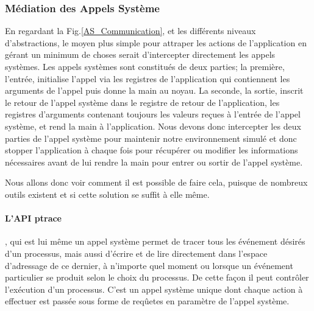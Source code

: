     

\subsubsection{Médiation des Appels Système}

En regardant la Fig.\ref{AS_Communication}, et les différents niveaux
d'abstractions, le moyen plus simple pour attraper les actions de l'application
en gérant un minimum de choses serait d'intercepter directement les appels
systèmes.  Les appels systèmes sont constitués de deux parties; la première,
l'entrée, initialise l'appel via les registres de l'application qui contiennent
les arguments de l'appel puis donne la main au noyau. La seconde, la sortie,
inscrit le retour de l'appel système dans le registre de retour de
l'application, les registres d'arguments contenant toujours les valeurs reçues à
l'entrée de l'appel système, et rend la main à l'application. Nous devons donc
intercepter les deux parties de l'appel système pour maintenir notre
environnement simulé et donc stopper l'application à chaque fois pour récupérer
ou modifier les informations nécessaires avant de lui rendre la main pour entrer
ou sortir de l'appel système.

 Nous allons donc voir comment il est possible de faire cela, puisque de
 nombreux outils existent {\color{red}et si cette solution se suffit à elle
   même.}
 
 \paragraph{L'API ptrace}\cite{INTERCEPTION:AS, INTERCEPTION:MARION},
 qui est lui même un appel système permet de tracer tous les événement désirés
 d'un processus, mais aussi d'écrire et de lire directement dans l'espace
 d'adressage de ce dernier, à n'importe quel moment ou lorsque un événement
 particulier se produit selon le choix du processus. De cette façon il peut
 contrôler l'exécution d'un processus. C'est un appel système unique dont chaque
 action à effectuer est passée sous forme de reqûetes en paramètre de l'appel
 système.

